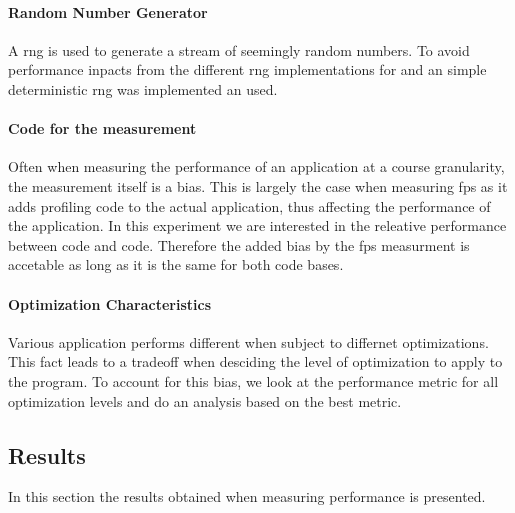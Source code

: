 \paragraph{Random Number Generator}
A \gls{rng} is used to generate a stream of seemingly random numbers.
To avoid performance inpacts from the different \gls{rng} implementations for {\C} and {\rust} an simple deterministic \gls{rng} was implemented an used.

\paragraph{Code for the measurement}
Often when measuring the performance of an application at a course granularity, the measurement itself is a bias.
This is largely the case when measuring \gls{fps} as it adds profiling code to the actual application, thus affecting the performance of the application.
In this experiment we are interested in the releative performance between {\C} code and {\rust} code.
Therefore the added bias by the \gls{fps} measurment is accetable as long as it is the same for both code bases.

\paragraph{Optimization Characteristics}
Various application performs different when subject to differnet optimizations.
This fact leads to a tradeoff when desciding the level of optimization to apply to the program.
To account for this bias, we look at the performance metric for all optimization levels and do an analysis based on the best metric.

\subsection{Results}
\label{sec:perf:res}

In this section the results obtained when measuring performance is presented.

